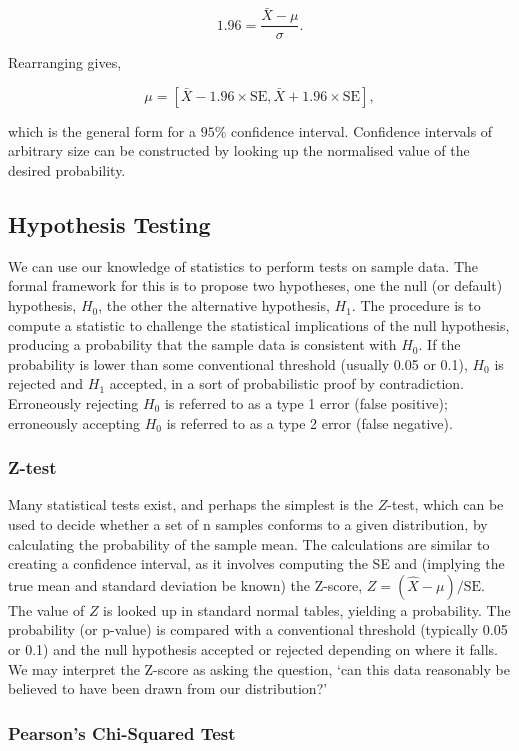 \documentclass[11pt]{amsart}
\begin{document}
$$1.96 = \frac{\bar{X} - \mu}{\sigma}.$$

Rearranging gives,

$$\mu = [\bar{X} - 1.96\times\text{SE}, \bar{X} + 1.96\times\text{SE}],$$

which is the general form for a $95\%$ confidence interval. Confidence intervals of arbitrary size can be constructed by looking up the normalised value of the desired probability.

\subsection{Hypothesis Testing}

We can use our knowledge of statistics to perform tests on sample data. The formal framework for this is to propose two hypotheses, one the null (or default) hypothesis, $H_0$, the other the alternative hypothesis, $H_1$. The procedure is to compute a statistic to challenge the statistical implications of the null hypothesis, producing a probability that the sample data is consistent with $H_0$. If the probability is lower than some conventional threshold (usually 0.05 or 0.1), $H_0$ is rejected and $H_1$ accepted, in a sort of probabilistic proof by contradiction. Erroneously rejecting $H_0$ is referred to as a type 1 error (false positive); erroneously accepting $H_0$ is referred to as a type 2 error (false negative).

\subsubsection{Z-test}

Many statistical tests exist, and perhaps the simplest is the $Z$-test, which can be used to decide whether a set of n samples conforms to a given distribution, by calculating the probability of the sample mean. The calculations are similar to creating a confidence interval, as it involves computing the SE and (implying the true mean and standard deviation be known) the Z-score, $Z = (\hat{X} - \mu)/\text{SE}$. The value of $Z$ is looked up in standard normal tables, yielding a probability. The probability (or p-value) is compared with a conventional threshold (typically 0.05 or 0.1) and the null hypothesis accepted or rejected depending on where it falls. We may interpret the Z-score as asking the question, `can this data reasonably be believed to have been drawn from our distribution?'

\subsubsection{Pearson's Chi-Squared Test}
\end{document}
